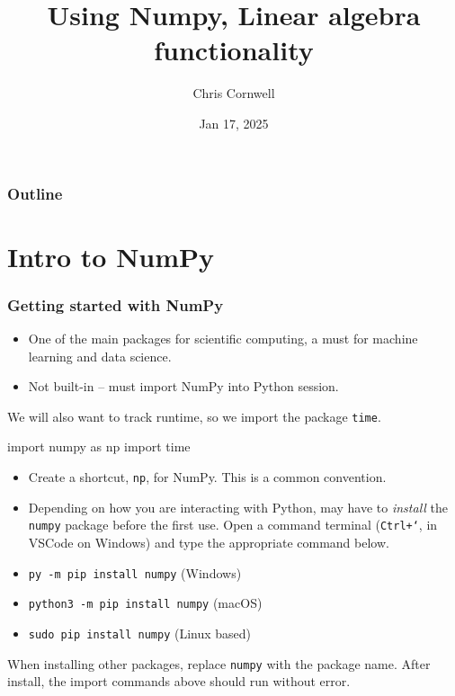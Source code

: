 \documentclass{beamer}
\author{Chris Cornwell}
\date{Jan 17, 2025}
\title{Using Numpy, Linear algebra functionality}
\newenvironment{codeblock}
    {\hfill\begin{beamerboxesrounded}[lower=codecol, width=0.8\textwidth]
    \medskip

    }
    { 
    \end{beamerboxesrounded}\hfill
    }
\theoremstyle{example}
\newcommand{\ttt}[1]{{\small\texttt{#1}}}
\begin{document}
\begin{frame}
\titlepage
\end{frame}

\begin{frame}
\frametitle{Outline}
\tableofcontents
\end{frame}

\section{Intro to NumPy}

\begin{frame}[fragile]
\frametitle{Getting started with NumPy}
\begin{itemize}
    \item One of the main packages for scientific computing, a must for machine learning and data science. 
    \item Not built-in {--} must import NumPy into Python session. 
\end{itemize}
\pause
We will also want to track runtime, so we import the package \ttt{time}.

\pause 
\begin{codeblock}

\begin{python}
    import numpy as np
    import time
\end{python}

\end{codeblock}

\begin{itemize}
    \item[] Create a shortcut, \ttt{np}, for NumPy. This is a common convention.
\end{itemize}

\pause
\begin{itemize}
	\item Depending on how you are interacting with Python, may have to \emph{install} the \ttt{numpy} package before the first use. Open a command terminal (\ttt{Ctrl+`}, in VSCode on Windows) and type the appropriate command below.
\end{itemize}
\begin{itemize}
	\item[] \ttt{py -m pip install numpy} (Windows)
	\item[] \ttt{python3 -m pip install numpy} (macOS)
    \item[] \ttt{sudo pip install numpy} (Linux based)
\end{itemize}
When installing other packages, replace \ttt{numpy} with the package name. After install, the import commands above should run without error.

\end{frame}
\end{document}
